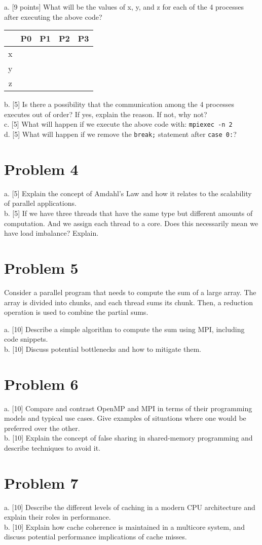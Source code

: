 \documentclass{article}
\begin{document}
a. [9 points] What will be the values of x, y, and z for each of the 4 processes after executing the above code?

\begin{tabular}{|c|c|c|c|c|}
\hline
 & P0 & P1 & P2 & P3 \\ \hline
x &  &  &  &  \\ \hline
y &  &  &  &  \\ \hline
z &  &  &  &  \\ \hline
\end{tabular}

b. [5] Is there a possibility that the communication among the 4 processes executes out of order? If yes, explain the reason. If not, why not? \\
c. [5] What will happen if we execute the above code with: \texttt{mpiexec -n 2} \\
d. [5] What will happen if we remove the \texttt{break;} statement after \texttt{case 0:}?


\section*{Problem 4}
a. [5] Explain the concept of Amdahl's Law and how it relates to the scalability of parallel applications.  \\
b. [5] If we have three threads that have the same type but different amounts of computation. And we assign each thread to a core. Does this necessarily mean we have load imbalance? Explain.

\section*{Problem 5}
Consider a parallel program that needs to compute the sum of a large array.  The array is divided into chunks, and each thread sums its chunk.  Then, a reduction operation is used to combine the partial sums.

a. [10] Describe a simple algorithm to compute the sum using MPI, including code snippets. \\
b. [10] Discuss potential bottlenecks and how to mitigate them.


\section*{Problem 6}
a. [10] Compare and contrast OpenMP and MPI in terms of their programming models and typical use cases.  Give examples of situations where one would be preferred over the other. \\
b. [10] Explain the concept of false sharing in shared-memory programming and describe techniques to avoid it.


\section*{Problem 7}
a. [10] Describe the different levels of caching in a modern CPU architecture and explain their roles in performance. \\
b. [10] Explain how cache coherence is maintained in a multicore system, and discuss potential performance implications of cache misses.
\end{document}

